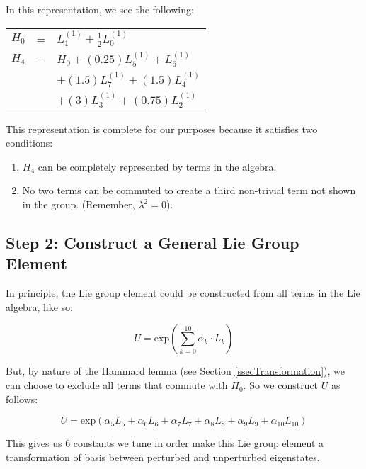 \documentclass{article}
\begin{document}
In this representation, we see the following:

\begin{table}[!hp]
\begin{center}
\begin{tabular}{rcl}
$H_{0}$ & = & $L_{1}^{(1)}+\frac{1}{2}L_{0}^{(1)}$ \\
$H_{4}$ & = & $H_{0} + (0.25)L_{5}^{(1)} + L_{6}^{(1)}$ \nonumber \\
        &   & $+ (1.5)L_{7}^{(1)} + (1.5)L_{4}^{(1)}$ \nonumber \\
        &   & $+ (3)L_{3}^{(1)} + (0.75)L_{2}^{(1)}$
\end{tabular}
\end{center}
\end{table}

\newpage
This representation is complete for our purposes because it satisfies two conditions:
\label{secTwoConditions}

\begin{enumerate}
\item $H_{4}$ can be completely represented by terms in the algebra.
\item No two terms can be commuted to create a third non-trivial term not shown in the group.  (Remember, $\lambda^{2} = 0$).
\end{enumerate}

\subsection{Step 2: Construct a General Lie Group Element}

In principle, the Lie group element could be constructed from all terms in the Lie algebra, like so:

\begin{equation}
U = \textrm{exp}(\sum\limits_{k=0}^{10} \alpha_{k}{\cdot}L_{k})
\end{equation}

But, by nature of the Hammard lemma (see Section \ref{ssecTransformation}), we can choose to exclude all terms that commute with $H_{0}$.  So we construct $U$ as follows:

\begin{equation}
U = \textrm{exp}(\alpha_{5}L_{5}+\alpha_{6}L_{6}+\alpha_{7}L_{7}+\alpha_{8}L_{8}+\alpha_{9}L_{9}+\alpha_{10}L_{10})
\end{equation}

This gives us 6 constants we tune in order make this Lie group element a transformation of basis between perturbed and unperturbed eigenstates.
\end{document}
